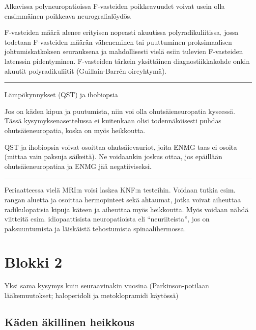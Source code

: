 \documentclass[
]{book}
\begin{document}
Alkavissa polyneuropatioissa F-vasteiden poikkeavuudet voivat usein olla ensimmäinen poikkeava neurografialöydös.

F-vasteiden määrä alenee erityisen nopeasti akuutissa polyradikuliitissa, jossa todetaan F-vasteiden määrän väheneminen tai puuttuminen proksimaalisen johtumiskatkoksen seurauksena ja mahdollisesti vielä esiin tulevien F-vasteiden latenssin pidentyminen. F-vasteiden tärkein yksittäinen diagnostiikkakohde onkin akuutit polyradikuliitit (Guillain-Barrén oireyhtymä).

\begin{center}\rule{0.5\linewidth}{0.5pt}\end{center}

Lämpökynnykset (QST) ja ihobiopsia

Jos on käden kipua ja puutumista, niin voi olla ohutsäieneuropatia kyseessä. Tässä kysymyksenasettelussa ei kuitenkaan olisi todennäköisesti puhdas ohutsäieneuropatia, koska on myös heikkoutta.

QST ja ihobiopsia voivat osoittaa ohutsäievauriot, joita ENMG taas ei osoita (mittaa vain paksuja säikeitä). Ne voidaankin joskus ottaa, jos epäillään ohutsäieneuropatiaa ja ENMG jää negatiiviseksi.

\begin{center}\rule{0.5\linewidth}{0.5pt}\end{center}

Periaatteessa vielä MRI:n voisi laskea KNF:n testeihin. Voidaan tutkia esim. rangan aluetta ja osoittaa hermopinteet sekä ahtaumat, jotka voivat aiheuttaa radikulopatisia kipuja käteen ja aiheuttaa myös heikkoutta. Myös voidaan nähdä viitteitä esim. idiopaattisista neuropatioista eli ``neuriiteista'', jos on paksuuntumista ja läiskäistä tehostumista spinaalihermossa.

\section{Blokki 2}\label{blokki-2-3}

Yksi sama kysymys kuin seuraavinakin vuosina (Parkinson-potilaan lääkemuutokset; haloperidoli ja metoklopramidi käytössä)

\subsection{Käden äkillinen heikkous}\label{kuxe4den-uxe4killinen-heikkous}
\end{document}
